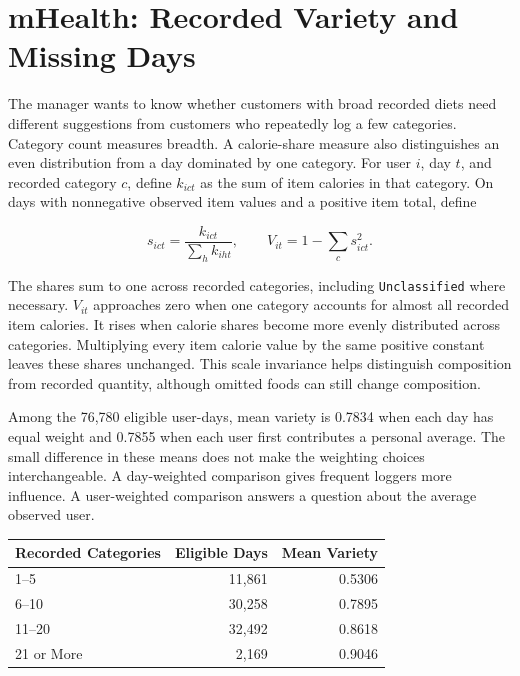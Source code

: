 \hypertarget{M02-mhealth-recorded-variety-and-missing-days}{%
\section{mHealth: Recorded Variety and Missing
Days}\label{M02-mhealth-recorded-variety-and-missing-days}}

\noindent The manager wants to know whether customers with broad recorded diets
need different suggestions from customers who repeatedly log a few
categories. Category count measures breadth. A calorie-share measure
also distinguishes an even distribution from a day dominated by one
category. For user \(i\), day \(t\), and recorded category \(c\), define
\(k_{ict}\) as the sum of item calories in that category. On days with
nonnegative observed item values and a positive item total, define

\[
s_{ict}=\frac{k_{ict}}{\sum_h k_{iht}},\qquad
V_{it}=1-\sum_c s_{ict}^2.
\]

The shares sum to one across recorded categories, including
\texttt{Unclassified} where necessary. \(V_{it}\) approaches zero when
one category accounts for almost all recorded item calories. It rises
when calorie shares become more evenly distributed across categories.
Multiplying every item calorie value by the same positive constant
leaves these shares unchanged. This scale invariance helps distinguish
composition from recorded quantity, although omitted foods can still
change composition.

Among the 76,780 eligible user-days, mean variety is 0.7834 when each
day has equal weight and 0.7855 when each user first contributes a
personal average. The small difference in these means does not make the
weighting choices interchangeable. A day-weighted comparison gives
frequent loggers more influence. A user-weighted comparison answers a
question about the average observed user.

\begin{table}[H]
\centering\small
\begin{tabular}{@{}lrr@{}}
\toprule
Recorded Categories & Eligible Days & Mean Variety \\
\midrule

1--5 & 11,861 & 0.5306 \\
6--10 & 30,258 & 0.7895 \\
11--20 & 32,492 & 0.8618 \\
21 or More & 2,169 & 0.9046 \\
\bottomrule
\end{tabular}
\end{table}

